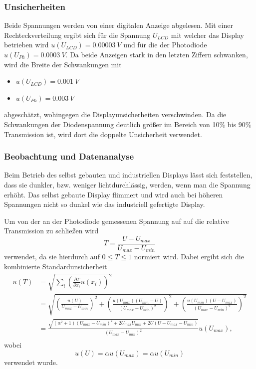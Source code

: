 \documentclass[
	a4paper,
	12pt,
	pagesize,
	ngerman
]{scrartcl}
\begin{document}
	\subsubsection{Unsicherheiten}
	Beide Spannungen werden von einer digitalen Anzeige abgelesen.
	Mit einer Rechteckverteilung ergibt sich für die Spannung $U_{LCD}$ mit welcher das Display betrieben wird $u(U_{LCD})=\SI{0.00003}{V}$ und für die der Photodiode $u(U_{Ph})=\SI{0.0003}{V}$.
	Da beide Anzeigen stark in den letzten Ziffern schwanken, wird die Breite der Schwankungen mit
	\begin{itemize}
		\item $u(U_{LCD})=\SI{0.001}{V}$
		\item $u(U_{Ph})=\SI{0.003}{V}$
	\end{itemize}
	abgeschätzt, wohingegen die Displayunsicherheiten verschwinden.
	Da die Schwankungen der Diodenspannung deutlich größer im Bereich von 10\% bis 90\% Transmission ist, wird dort die doppelte Unsicherheit verwendet.
	\subsubsection{Beobachtung und Datenanalyse}
	Beim Betrieb des selbst gebauten und industriellen Displays lässt sich feststellen, dass sie dunkler, bzw. weniger lichtdurchlässig, werden, wenn man die Spannung erhöht.
	Das selbst gebaute Display flimmert und wird auch bei höheren Spannungen nicht so dunkel wie das industriell gefertigte Display.

	Um von der an der Photodiode gemessenen Spannung auf auf die relative Transmission zu schließen wird %
	\begin{equation}
			T = \frac{U-U_{max}}{U_{max}-U_{min}}
	\end{equation}
	verwendet, da sie hierdurch auf $0\leq T \leq 1$ normiert wird. Dabei ergibt sich die kombinierte Standardunsicherheit
	\begin{align*}
		u(T) &= \sqrt{\sum_{i}\left(\frac{\partial T}{\partial x_i} u(x_i)\right)^2}\\
		&= \sqrt{\left(\frac{u(U)}{U_{max}-U_{min}}\right)^2+\left(\frac{u(U_{max})(U_{min}-U)}{(U_{max}-U_{min})^2}\right)^2+\left(\frac{u(U_{min})(U-U_{max})}{(U_{max}-U_{min})^2}\right)^2} \\
		&=	\frac{\sqrt{ (\alpha^2+1) (U_{max}-U_{min})^2+2U_{max}U_{min}+2U(U-U_{max}-U_{min})}}{(U_{max}-U_{min})^2} u(U_{max}), \\
	\end{align*}
	wobei
	\begin{equation*}
			u(U)=\alpha u(U_{max})=\alpha u(U_{min})
	\end{equation*}
	verwendet wurde.
\end{document}
